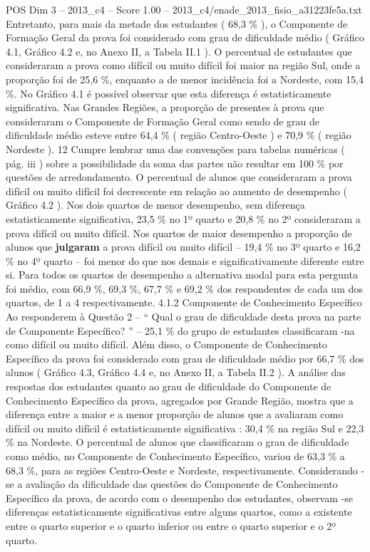 \begin{textsample}{POS Dim 3 – 2013\_c4 – Score 1.00 – 2013\_c4/enade\_2013\_fisio\_a31223fe5a.txt}
Entretanto, para mais da metade dos estudantes ( 68,3 \% ), o Componente de Formação Geral da prova foi considerado com grau de dificuldade médio ( Gráfico 4.1, Gráfico 4.2 e, no Anexo II, a Tabela II.1 ).
O percentual de estudantes que consideraram a prova como difícil ou muito difícil foi maior na região Sul, onde a proporção foi de 25,6 \%, enquanto a de menor incidência foi a Nordeste, com 15,4 \%.
No Gráfico 4.1 é possível observar que esta diferença é estatisticamente significativa.
Nas Grandes Regiões, a proporção de presentes à prova que consideraram o Componente de Formação Geral como sendo de grau de dificuldade médio esteve entre 64,4 \% ( região Centro-Oeste ) e 70,9 \% ( região Nordeste ). 12 Cumpre lembrar uma das convenções para tabelas numéricas ( pág. iii ) sobre a possibilidade da soma das partes não resultar em 100 \% por questões de arredondamento.
O percentual de alunos que consideraram a prova difícil ou muito difícil foi decrescente em relação ao aumento de desempenho ( Gráfico 4.2 ).
Nos dois quartos de menor desempenho, sem diferença estatisticamente significativa, 23,5 \% no 1º quarto e 20,8 \% no 2º consideraram a prova difícil ou muito difícil.
Nos quartos de maior desempenho a proporção de alunos que \textbf{julgaram} a prova difícil ou muito difícil – 19,4 \% no 3º quarto e 16,2 \% no 4º quarto – foi menor do que nos demais e significativamente diferente entre si.
Para todos os quartos de desempenho a alternativa modal para esta pergunta foi médio, com 66,9 \%, 69,3 \%, 67,7 \% e 69,2 \% dos respondentes de cada um dos quartos, de 1 a 4 respectivamente. 4.1.2 Componente de Conhecimento Específico Ao responderem à Questão 2 – “ Qual o grau de dificuldade desta prova na parte de Componente Específico? ” – 25,1 \% do grupo de estudantes classificaram -na como difícil ou muito difícil.
Além disso, o Componente de Conhecimento Específico da prova foi considerado com grau de dificuldade médio por 66,7 \% dos alunos ( Gráfico 4.3, Gráfico 4.4 e, no Anexo II, a Tabela II.2 ).
A análise das respostas dos estudantes quanto ao grau de dificuldade do Componente de Conhecimento Específico da prova, agregados por Grande Região, mostra que a diferença entre a maior e a menor proporção de alunos que a avaliaram como difícil ou muito difícil é estatisticamente significativa : 30,4 \% na região Sul e 22,3 \% na Nordeste.
O percentual de alunos que classificaram o grau de dificuldade como médio, no Componente de Conhecimento Específico, variou de 63,3 \% a 68,3 \%, para as regiões Centro-Oeste e Nordeste, respectivamente.
Considerando -se a avaliação da dificuldade das questões do Componente de Conhecimento Específico da prova, de acordo com o desempenho dos estudantes, observam -se diferenças estatisticamente significativas entre alguns quartos, como a existente entre o quarto superior e o quarto inferior ou entre o quarto superior e o 2º quarto.

\end{textsample}
